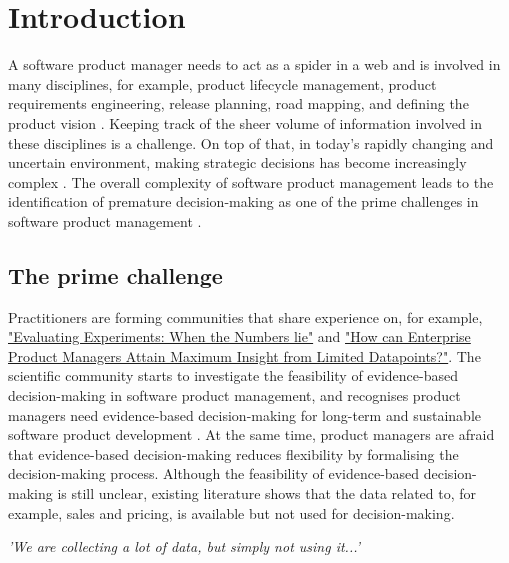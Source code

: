 \section{Introduction} \label{introduction}
A software product manager needs to act as a spider in a web and is involved in many disciplines, for example, product lifecycle management, product requirements engineering, release planning, road mapping, and defining the product vision \parencite{PM02}. Keeping track of the sheer volume of information involved in these disciplines is a challenge. On top of that, in today's rapidly changing and uncertain environment, making strategic decisions has become increasingly complex \parencite{DM01}. The overall complexity of software product management leads to the identification of premature decision-making as one of the prime challenges in software product management \parencite{PM04}. 

\subsection{The prime challenge}
Practitioners are forming communities \parencite{WEB01} that share experience on, for example, \href{https://www.mindtheproduct.com/2018/10/evaluating-experiments-when-the-numbers-lie/}{"Evaluating Experiments: When the Numbers lie"} and \href{https://www.mindtheproduct.com/2019/01/how-can-enterprise-product-managers-attain-maximum-insight-from-limited-datapoints/}{"How can Enterprise Product Managers Attain Maximum Insight from Limited Datapoints?"}. The scientific community starts to investigate the feasibility of evidence-based decision-making in software product management, and recognises product managers need evidence-based decision-making for long-term and sustainable software product development \parencite{PM04}. At the same time, product managers are afraid that evidence-based decision-making reduces flexibility by formalising the decision-making process. Although the feasibility of evidence-based decision-making is still unclear, existing literature shows that the data related to, for example, sales and pricing, is available but not used for decision-making.
\begin{quoting}\itshape
'We are collecting a lot of data, but simply not using it...' \parencite{PM04}
\end{quoting}

